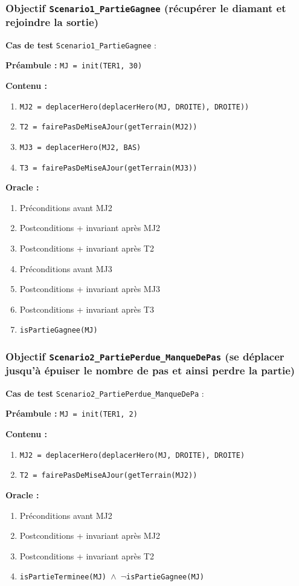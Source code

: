 \documentclass{article}
\newcommand{\cmd}[1]{\texttt{#1}}
\newcommand{\lAND}{$\land$}
\newcommand{\lNOT}{$\lnot$}
\newcommand{\obj}[2]{\subsubsection*{\large{\textbf{Objectif {\cmd{#1} (#2)}}}}}
\newenvironment{cas}[1]
{
	\hspace{1em}\textbf{Cas de test} \cmd{#1} :
	\begin{list}{}{}
}{
	\end{list}\vspace{1em}
}
\newcommand{\pre}[1]{\item \textbf{Préambule :} \cmd{#1}}
\newcommand{\oram}{\item \textbf{Oracle :}}
\newcommand{\opem}{\item \textbf{Contenu :}}
\begin{document}
\obj{Scenario1\_PartieGagnee} {récupérer le diamant et rejoindre la sortie}
	\begin{cas} {Scenario1\_PartieGagnee}
		\pre{MJ = init(TER1, 30)}
		\opem{}
		\begin{enumerate}
			\item \cmd{MJ2 = deplacerHero(deplacerHero(MJ, DROITE), DROITE))}
			\item \cmd{T2 = fairePasDeMiseAJour(getTerrain(MJ2))}
			\item \cmd{MJ3 = deplacerHero(MJ2, BAS)}
			\item \cmd{T3 = fairePasDeMiseAJour(getTerrain(MJ3))}
		\end{enumerate}
		\oram{}
		\begin{enumerate}
			\item Préconditions avant MJ2
			\item Postconditions + invariant après MJ2
			\item Postconditions + invariant après T2
			\item Préconditions avant MJ3
			\item Postconditions + invariant après MJ3
			\item Postconditions + invariant après T3
			\item \cmd{isPartieGagnee(MJ)}
		\end{enumerate}
	\end{cas}



\obj{Scenario2\_PartiePerdue\_ManqueDePas} {se déplacer jusqu'à épuiser le nombre de pas et ainsi perdre la partie}
	\begin{cas} {Scenario2\_PartiePerdue\_ManqueDePa}
		\pre{MJ = init(TER1, 2)}
		\opem{}
		\begin{enumerate}
			\item \cmd{MJ2 = deplacerHero(deplacerHero(MJ, DROITE), DROITE)}
			\item \cmd{T2 = fairePasDeMiseAJour(getTerrain(MJ2))}
		\end{enumerate}
		\oram{}
		\begin{enumerate}
			\item Préconditions avant MJ2
			\item Postconditions + invariant après MJ2
			\item Postconditions + invariant après T2
			\item \cmd{isPartieTerminee(MJ) \lAND{} \lNOT{}isPartieGagnee(MJ)}
		\end{enumerate}
	\end{cas}
\end{document}
